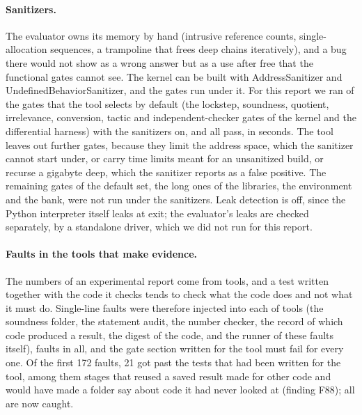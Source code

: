 \paragraph{Sanitizers.}
The evaluator owns its memory by hand (intrusive reference counts, single-allocation sequences, a trampoline that frees deep chains iteratively), and a bug there would not show as a wrong answer but as a use after free that the functional gates cannot see.
The kernel can be built with AddressSanitizer and UndefinedBehaviorSanitizer, and the gates run under it.
For this report we ran \sanGates{} of the \sanDefault{} gates that the tool selects by default (the lockstep, soundness, quotient, irrelevance, conversion, tactic and independent-checker gates of the kernel and the differential harness) with the sanitizers on, and all pass, in \sanSeconds{} seconds.
The tool leaves out \sanLeftOut{} further gates, because they limit the address space, which the sanitizer cannot start under, or carry time limits meant for an unsanitized build, or recurse a gigabyte deep, which the sanitizer reports as a false positive.
The remaining gates of the default set, the long ones of the libraries, the environment and the bank, were not run under the sanitizers.
Leak detection is off, since the Python interpreter itself leaks at exit; the evaluator's leaks are checked separately, by a standalone driver, which we did not run for this report.

\paragraph{Faults in the tools that make evidence.}
The numbers of an experimental report come from tools, and a test written together with the code it checks tends to check what the code does and not what it must do.
Single-line faults were therefore injected into each of \toolCount{} tools (the soundness folder, the statement audit, the number checker, the record of which code produced a result, the digest of the code, and the runner of these faults itself), \toolFaults{} faults in all, and the gate section written for the tool must fail for every one.
Of the first 172 faults, 21 got past the tests that had been written for the tool, among them stages that reused a saved result made for other code and would have made a folder say  about code it had never looked at (finding F88); all \toolFaults{} are now caught.

